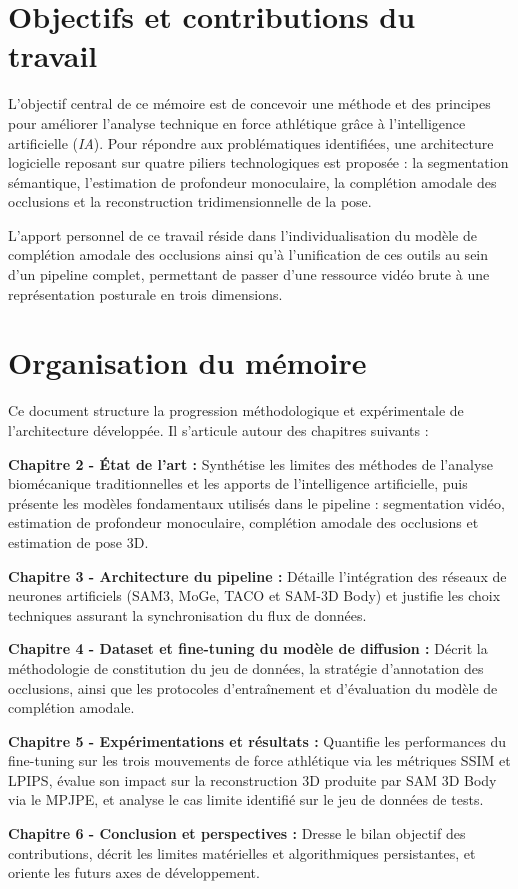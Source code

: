 \section{Objectifs et contributions du travail} \label{one_three}

L'objectif central de ce mémoire est de concevoir une méthode et des principes pour améliorer l'analyse technique en force athlétique grâce à l'intelligence artificielle (\textit{IA}). Pour répondre aux problématiques identifiées, une architecture logicielle reposant sur quatre piliers technologiques est proposée : la segmentation sémantique, l'estimation de profondeur monoculaire, la complétion amodale des occlusions et la reconstruction tridimensionnelle de la pose.

L'apport personnel de ce travail réside dans l'individualisation du modèle de complétion amodale des occlusions ainsi qu'à l'unification de ces outils au sein d'un pipeline complet, permettant de passer d'une ressource vidéo brute à une représentation posturale en trois dimensions.

\section{Organisation du mémoire} \label{one_four}

Ce document structure la progression méthodologique et expérimentale de l'architecture développée. Il s'articule autour des chapitres suivants :

\textbf{Chapitre 2 - État de l'art :} Synthétise les limites des méthodes de l'analyse biomécanique traditionnelles et les apports de l'intelligence artificielle, puis présente les modèles fondamentaux utilisés dans le pipeline : segmentation vidéo, estimation de profondeur monoculaire, complétion amodale des occlusions et estimation de pose 3D.

\textbf{Chapitre 3 - Architecture du pipeline :} Détaille l'intégration des réseaux de neurones artificiels (SAM3, MoGe, TACO et SAM-3D Body) et justifie les choix techniques assurant la synchronisation du flux de données.

\textbf{Chapitre 4 - Dataset et fine-tuning du modèle de diffusion :} Décrit la méthodologie de constitution du jeu de données, la stratégie d'annotation des occlusions, ainsi que les protocoles d'entraînement et d'évaluation du modèle de complétion amodale.

\textbf{Chapitre 5 - Expérimentations et résultats :} Quantifie les performances du fine-tuning sur les trois mouvements de force athlétique via les métriques SSIM et LPIPS, évalue son impact sur la reconstruction 3D produite par SAM 3D Body via le MPJPE, et analyse le cas limite identifié sur le jeu de données de tests.

\textbf{Chapitre 6 - Conclusion et perspectives :} Dresse le bilan objectif des contributions, décrit les limites matérielles et algorithmiques persistantes, et oriente les futurs axes de développement.